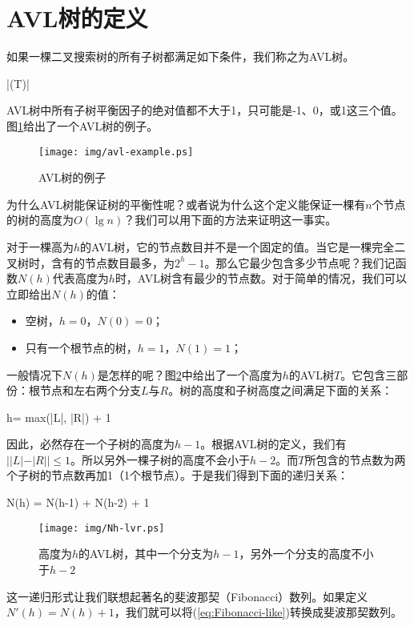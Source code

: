 \documentclass[UTF8]{article}
\begin{document}
\section{AVL树的定义}

如果一棵二叉搜索树的所有子树都满足如下条件，我们称之为AVL树。

\be
  |\delta(T)| 
\ee

AVL树中所有子树平衡因子的绝对值都不大于1，只可能是-1、0，或1这三个值。图\ref{fig:avl-example}给出了一个AVL树的例子。

\begin{figure}[htbp]
   \centering
   \texttt{[image: img/avl-example.ps]}
   \caption{AVL树的例子} \label{fig:avl-example}
\end{figure}

为什么AVL树能保证树的平衡性呢？或者说为什么这个定义能保证一棵有$n$个节点的树的高度为$O(\lg n)$？我们可以用下面的方法来证明这一事实。

对于一棵高为$h$的AVL树，它的节点数目并不是一个固定的值。当它是一棵完全二叉树时，含有的节点数目最多，为$2^h-1$。那么它最少包含多少节点呢？我们记函数$N(h)$代表高度为$h$时，AVL树含有最少的节点数。对于简单的情况，我们可以立即给出$N(h)$的值：

\begin{itemize}
\item 空树，$h=0$，$N(0)=0$；
\item 只有一个根节点的树，$h=1$，$N(1)=1$；
\end{itemize}

一般情况下$N(h)$是怎样的呢？图\ref{fig:N-h-relation}中给出了一个高度为$h$的AVL树$T$。它包含三部份：根节点和左右两个分支$L$与$R$。树的高度和子树高度之间满足下面的关系：

\be
  h= max(|L|, |R|) + 1
\ee

因此，必然存在一个子树的高度为$h-1$。根据AVL树的定义，我们有 $||L| -|R|| \leq 1$。所以另外一棵子树的高度不会小于$h-2$。而$T$所包含的节点数为两个子树的节点数再加1（1个根节点）。于是我们得到下面的递归关系：

\be
  N(h) = N(h-1) + N(h-2) + 1
  \label{eq:Fibonacci-like}
\ee

\begin{figure}[htbp]
   \centering
   \texttt{[image: img/Nh-lvr.ps]}
   \caption{高度为$h$的AVL树，其中一个分支为$h-1$，另外一个分支的高度不小于$h-2$} \label{fig:N-h-relation}
\end{figure}

这一递归形式让我们联想起著名的斐波那契（Fibonacci）数列。如果定义$N'(h) = N(h)+1$，我们就可以将(\ref{eq:Fibonacci-like})转换成斐波那契数列。
\end{document}
